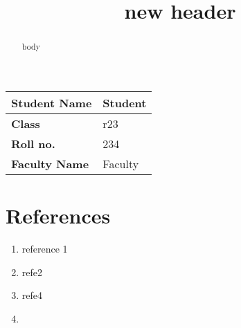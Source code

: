\documentclass{article}
\title{new header}
\date{}
\begin{document}
    \maketitle

    \begin{table}[h!]
    \centering
    \begin{tabular}{|p{4cm}|p{10cm}|}
        \hline
        \textbf{Student Name} & Student \\ \hline
        \textbf{Class} & r23 \\ \hline
        \textbf{Roll no.} & 234 \\ \hline
        \textbf{Faculty Name} & Faculty \\ \hline
    \end{tabular}
    \label{tab:faculty_student_details}
    \end{table}

    \begin{abstract}
    body
    \end{abstract}

    \section*{References}

    \begin{enumerate}
        \item reference 1
        \item refe2
        
        \item refe4
        
        \item  
    \end{enumerate}

    
\end{document}
